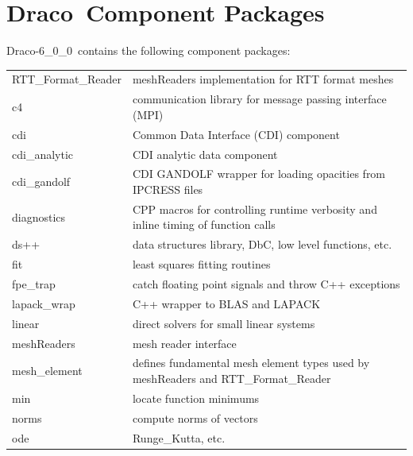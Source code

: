\documentclass[note]{ResearchNote}
\newcommand{\draco}{Draco}
\newcommand{\dracor}{\draco-6\_0\_0}
\newcommand{\tableText}[1]{{\raggedright #1}}
\begin{document}
\newpage

\section{\draco\ Component Packages}

\dracor\ contains the following component packages:
\begin{center}
  \footnotesize
  \begin{tabular}{lp{4.0in}}
    \hline\hline
    \textsf{RTT\_Format\_Reader} & \tableText{\textsf{meshReaders}
      implementation for RTT format meshes} \\
    \textsf{c4} & \tableText{communication library for message passing interface (MPI)} \\
    \textsf{cdi} & \tableText{Common Data Interface (CDI) component} \\
    \textsf{cdi\_analytic} & \tableText{CDI analytic data component} \\
    \textsf{cdi\_gandolf} & \tableText{CDI GANDOLF wrapper for loading
    opacities from IPCRESS files} \\
    \textsf{diagnostics}  & \tableText{CPP macros for controlling runtime
      verbosity and inline timing of function calls} \\
    \textsf{ds++}         & \tableText{data structures library, DbC,
      low level functions, etc.} \\
    \textsf{fit}          & \tableText{least squares fitting routines} \\
    \textsf{fpe\_trap}    & \tableText{catch floating point signals and throw
      C++ exceptions} \\
    \textsf{lapack\_wrap} & \tableText{C++ wrapper to BLAS and LAPACK} \\
    \textsf{linear}       & \tableText{direct solvers for small linear systems} \\
    \textsf{meshReaders}  & \tableText{mesh reader interface} \\
    \textsf{mesh\_element} & \tableText{defines fundamental mesh element types
      used by meshReaders and RTT\_Format\_Reader} \\
    \textsf{min}          & \tableText{locate function minimums} \\
    \textsf{norms}        & \tableText{compute norms of vectors} \\
    \textsf{ode}          & \tableText{Runge\_Kutta, etc.} \\

\end{tabular}
\end{center}
\end{document}
